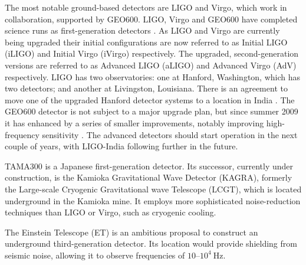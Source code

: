 The most notable ground-based detectors are LIGO and Virgo, which work in collaboration, supported by GEO600. LIGO, Virgo and GEO600 have completed science runs as first-generation detectors \citep[e.g.,][]{Abadie2010}. As LIGO and Virgo are currently being upgraded their initial configurations are now referred to as Initial LIGO (iLIGO) and Initial Virgo (iVirgo) respectively. The upgraded, second-generation versions are referred to as Advanced LIGO (aLIGO) and Advanced Virgo (AdV) respectively. LIGO has two observatories: one at Hanford, Washington, which has two detectors; and another at Livingston, Louisiana. There is an agreement to move one of the upgraded Hanford detector systems to a location in India \citep{LIGO-India,Unnikrishnan2013}. The GEO600 detector is not subject to a major upgrade plan, but since summer 2009 it has enhanced by a series of smaller improvements, notably improving high-frequency sensitivity \citep[GEO-HF;][]{2006CQGra..23S.207W}. The advanced detectors should start operation in the next couple of years, with LIGO-India following further in the future.

TAMA300 is a Japanese first-generation detector. Its successor, currently under construction, is the Kamioka Gravitational Wave Detector (KAGRA), formerly the Large-scale Cryogenic Gravitational wave Telescope (LCGT), which is located underground in the Kamioka mine. It employs more sophisticated noise-reduction techniques than LIGO or Virgo, such as cryogenic cooling.

The Einstein Telescope (ET) is an ambitious proposal to construct an underground third-generation detector. Its location would provide shielding from seismic noise, allowing it to observe frequencies of $10$--$10^4~\mathrm{Hz}$. 

